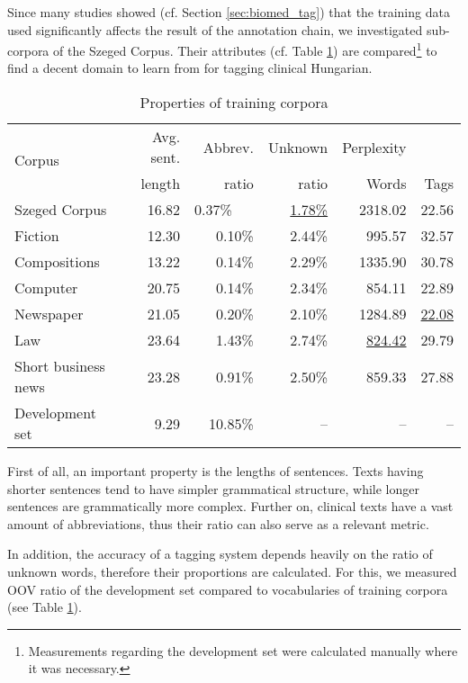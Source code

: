 Since many studies showed (cf. Section \ref{sec:biomed_tag}) that the training data used significantly affects the result of the annotation chain, we investigated sub-corpora of the Szeged Corpus. 
Their attributes (cf. Table \ref{tab:subcorpora_attrib}) are  compared\footnote{Measurements regarding the development set were calculated manually where it was necessary.} to find a decent domain to learn from for tagging clinical Hungarian. 

\begin{table}[h]
\centering
\caption{Properties of training corpora}
\label{tab:subcorpora_attrib}
\begin{tabular}{ l r r r r r } 
\hline
\multicolumn{1}{l}{\multirow{2}{*}{Corpus}} & Avg. sent. & Abbrev.  &  Unknown & Perplexity \\
 & length & ratio &  ratio & Words & Tags \\
\hline
Szeged Corpus & 16.82 & 0.37\%\ \ \  & \underline{1.78\%} & \ \ 2318.02 & 22.56\\
\hspace{0.2cm} Fiction & 12.30 & 0.10\% & 2.44\% & 995.57 & 32.57\\
\hspace{0.2cm} Compositions & 13.22 & 0.14\% & 2.29\% & 1335.90 & 30.78\\
\hspace{0.2cm} Computer & 20.75 & 0.14\% & 2.34\% & 854.11 & 22.89\\
\hspace{0.2cm} Newspaper & 21.05 & 0.20\% & 2.10\% & 1284.89 & \underline{22.08}\\
\hspace{0.2cm} Law & 23.64 & 1.43\% & 2.74\% & \underline{824.42} & 29.79\\
\hspace{0.2cm} Short business news & 23.28 & 0.91\% & 2.50\% & 859.33 & 27.88\\
Development set & 9.29 & 10.85\% & -- & -- & -- \\
\hline
\end{tabular}
\end{table}

First of all, an important property is the lengths of sentences. 
Texts having shorter sentences tend to have simpler grammatical structure, while longer sentences are grammatically more complex. 
Further on, clinical texts have a vast amount of abbreviations, thus their ratio can also serve as a relevant metric. 

In addition, the accuracy of a tagging system depends heavily on the ratio of unknown words, therefore their proportions are calculated. 
For this, we measured OOV ratio of the development set compared to vocabularies of training corpora (see Table \ref{tab:subcorpora_attrib}). 

